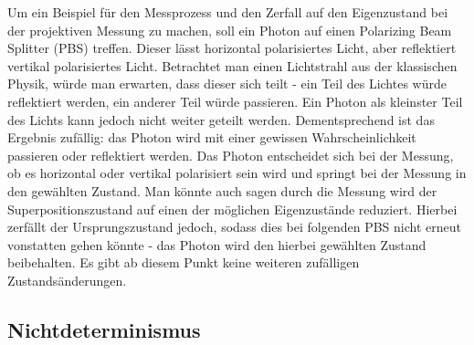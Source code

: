 Um ein Beispiel für den Messprozess und den Zerfall auf den Eigenzustand bei der projektiven Messung zu machen, soll ein Photon auf einen Polarizing Beam Splitter (PBS) treffen. Dieser lässt horizontal polarisiertes Licht, aber reflektiert vertikal polarisiertes Licht.
Betrachtet man einen Lichtstrahl aus der klassischen Physik, würde man erwarten, dass dieser sich teilt - ein Teil des Lichtes würde reflektiert werden, ein anderer Teil würde passieren. Ein Photon als kleinster Teil des Lichts kann jedoch nicht weiter geteilt werden.
Dementsprechend ist das Ergebnis zufällig: das Photon wird mit einer gewissen Wahrscheinlichkeit passieren oder reflektiert werden. Das Photon entscheidet sich bei der Messung, ob es horizontal oder vertikal polarisiert sein wird und springt bei der Messung in den gewählten Zustand.
Man könnte auch sagen durch die Messung wird der Superpositionszustand auf einen der möglichen Eigenzustände reduziert. Hierbei zerfällt der Ursprungszustand jedoch, sodass dies bei folgenden PBS nicht erneut vonstatten gehen könnte - das Photon wird den hierbei gewählten Zustand beibehalten.
Es gibt ab diesem Punkt keine weiteren zufälligen Zustandsänderungen. 
\cite{lvovsky_quantum_2018}

\subsection{Nichtdeterminismus}

